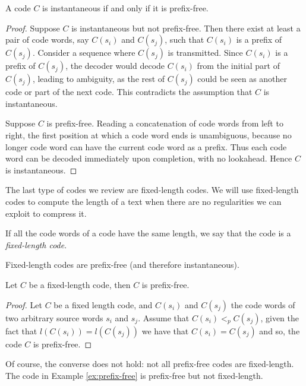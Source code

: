 \begin{proposition}
A code $C$ is instantaneous if and only if it is prefix-free.
\end{proposition}
\begin{proof}
Suppose $C$ is instantaneous but not prefix-free. Then there exist at least a pair of code words, say $C(s_i)$ and $C(s_j)$, such that $C(s_i)$ is a prefix of $C(s_j)$. Consider a sequence where $C(s_j)$ is transmitted. Since $C(s_i)$ is a prefix of $C(s_j)$, the decoder would decode $C(s_i)$ from the initial part of $C(s_j)$, leading to ambiguity, as the rest of $C(s_j)$ could be seen as another code or part of the next code. This contradicts the assumption that $C$ is instantaneous.

Suppose $C$ is prefix-free. Reading a concatenation of code words from left to right, the first position at which a code word ends is unambiguous, because no longer code word can have the current code word as a prefix. Thus each code word can be decoded immediately upon completion, with no lookahead. Hence $C$ is instantaneous.
\end{proof}

The last type of codes we review are fixed-length codes. We will use fixed-length codes to compute the length of a text when there are no regularities we can exploit to compress it.

\begin{definition}
\label{def:Fixed-Length-Codes}
If all the code words of a code have the same length, we say that the code is a \emph{fixed-length code}.
\end{definition}

Fixed-length codes are prefix-free (and therefore instantaneous).

\begin{proposition}
Let $C$ be a fixed-length code, then $C$ is prefix-free.
\end{proposition}
\begin{proof}
Let $C$ be a fixed length code, and $C(s_i)$ and $C(s_j)$ the code words of two arbitrary source words $s_i$ and $s_j$. Assume that $C(s_i) <_p C(s_j)$, given the fact that $l(C(s_i)) = l(C(s_j))$ we have that $C(s_i) = C(s_j)$ and so, the code $C$ is prefix-free.
\end{proof}

Of course, the converse does not hold: not all prefix-free codes are fixed-length. The code in Example \ref{ex:prefix-free} is prefix-free but not fixed-length.

